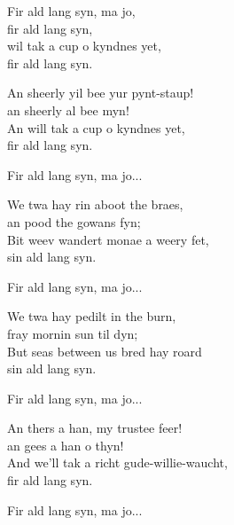 Fir ald lang syn, ma jo,\\
fir ald lang syn,\\
wil tak a cup o kyndnes yet,\\
fir ald lang syn.\par
\vspace{9pt}
An sheerly yil bee yur pynt-staup!\\
an sheerly al bee myn!\\
An will tak a cup o kyndnes yet,\\
fir ald lang syn.\par
\vspace{9pt}
Fir ald lang syn, ma jo...\par
\vspace{9pt}
We twa hay rin aboot the braes,\\
an pood the gowans fyn;\\
Bit weev wandert monae a weery fet,\\
sin ald lang syn.\par
\vspace{9pt}
Fir ald lang syn, ma jo...\par
\vspace{9pt}
We twa hay pedilt in the burn,\\
fray mornin sun til dyn;\\
But seas between us bred hay roard\\
sin ald lang syn.\par
\newpage
Fir ald lang syn, ma jo...\par
\vspace{10pt}
An thers a han, my trustee feer!\\
an gees a han o thyn!\\
And we'll tak a richt gude-willie-waucht,\\
fir ald lang syn.\par
\vspace{10pt}
Fir ald lang syn, ma jo...
